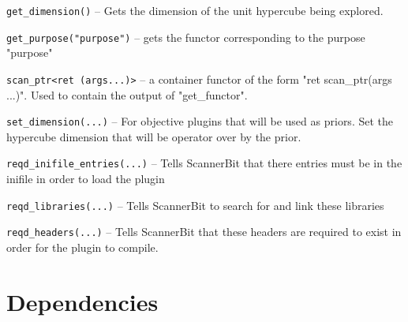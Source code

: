 \documentclass[11pt,a4paper]{article}
\begin{document}
\texttt{get\_dimension()}
-- Gets the dimension of the unit hypercube being explored.

\texttt{get\_purpose("purpose")}
-- gets the functor corresponding to the purpose "purpose"

\texttt{scan\_ptr<ret (args...)>}
-- a container functor of the form "ret scan\_ptr(args ...)".
   Used to contain the output of "get\_functor".
   
\texttt{set\_dimension(...)}
-- For objective plugins that will be used as priors.
   Set the hypercube dimension that will be operator
   over by the prior.
   
\texttt{reqd\_inifile\_entries(...)}
-- Tells ScannerBit that there entries must be in the inifile
   in order to load the plugin
   
\texttt{reqd\_libraries(...)}
-- Tells ScannerBit to search for and link these libraries

\texttt{reqd\_headers(...)}
-- Tells ScannerBit that these headers are required to exist
   in order for the plugin to compile.

\section{Dependencies}
\end{document}
